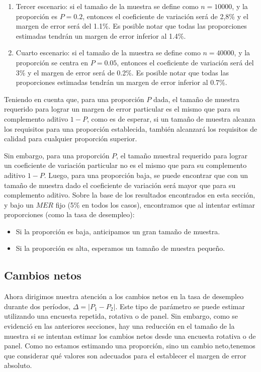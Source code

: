 \documentclass[
  12pt,
  spanish,
]{book}
\providecommand{\tightlist}{%
  \setlength{\itemsep}{0pt}\setlength{\parskip}{0pt}}
\begin{document}
\begin{enumerate}
\def\labelenumi{\arabic{enumi}.}
\setcounter{enumi}{2}
\item
  Tercer escenario: si el tamaño de la muestra se define como \(n = 10000\), y la proporción es \(P=0.2\), entonces el coeficiente de variación será de 2,8\% y el margen de error será del 1.1\%. Es posible notar que todas las proporciones estimadas tendrán un margen de error inferior al 1.4\%.
\item
  Cuarto escenario: si el tamaño de la muestra se define como \(n = 40000\), y la proporción se centra en \(P=0.05\), entonces el coeficiente de variación será del 3\% y el margen de error será de 0.2\%. Es posible notar que todas las proporciones estimadas tendrán un margen de error inferior al 0.7\%.
\end{enumerate}

Teniendo en cuenta que, para una proporción \(P\) dada, el tamaño de muestra requerido para lograr un margen de error particular es el mismo que para su complemento aditivo \(1-P\), como es de esperar, si un tamaño de muestra alcanza los requisitos para una proporción establecida, también alcanzará los requisitos de calidad para cualquier proporción superior.

Sin embargo, para una proporción \(P\), el tamaño muestral requerido para lograr un coeficiente de variación particular no es el mismo que para su complemento aditivo \(1-P\). Luego, para una proporción baja, se puede encontrar que con un tamaño de muestra dado el coeficiente de variación será mayor que para su complemento aditivo. Sobre la base de los resultados encontrados en esta sección, y bajo un \(MER\) fijo (5\% en todos los casos), encontramos que al intentar estimar proporciones (como la tasa de desempleo):

\begin{itemize}
\tightlist
\item
  Si la proporción es baja, anticipamos un gran tamaño de muestra.
\item
  Si la proporción es alta, esperamos un tamaño de muestra pequeño.
\end{itemize}

\hypertarget{cambios-netos}{%
\subsection*{Cambios netos}\label{cambios-netos}}

Ahora dirigimos nuestra atención a los cambios netos en la tasa de desempleo durante dos períodos, \(\Delta= |P_{1}-P_{2}|\). Este tipo de parámetro se puede estimar utilizando una encuesta repetida, rotativa o de panel. Sin embargo, como se evidenció en las anteriores secciones, hay una reducción en el tamaño de la muestra si se intentan estimar los cambios netos desde una encuesta rotativa o de panel. Como no estamos estimando una proporción, sino un cambio neto,tenemos que considerar qué valores son adecuados para el establecer el margen de error absoluto.
\end{document}
